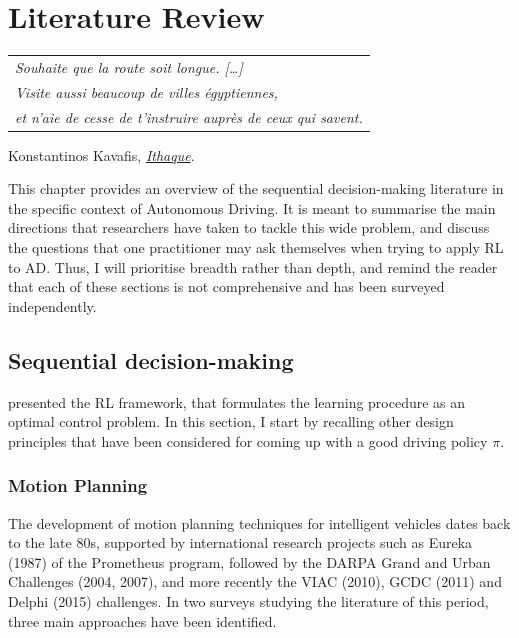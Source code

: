 
\graphicspath{{2-Chapters/2-Chapter/}}

\chapter{Literature Review}
\label{chapter:2}

\begin{flushright}
	\begin{tabular}{@{}l@{}}
		\emph{Souhaite que la route soit longue. [\dots]}\\
		\emph{Visite aussi beaucoup de villes égyptiennes,}\\
		\emph{et n’aie de cesse de t’instruire auprès de ceux qui savent.}\\
	\end{tabular}
	
	Konstantinos Kavafis, \href{https://eleurent.github.io/sisyphe/texts/ithaki.html}{\emph{Ithaque}}.
\end{flushright}

\abstractStartChapter{}%
This chapter provides an overview of the sequential decision-making literature in the specific context of Autonomous Driving. It is meant to summarise the main directions that researchers have taken to tackle this wide problem, and discuss the questions that one practitioner may ask themselves when trying to apply \acl*{RL} to \acl*{AD}. Thus, I will prioritise breadth rather than depth, and remind the reader that each of these sections is not comprehensive and has been surveyed independently.
\minitocStartChapter{}

\section{Sequential decision-making}
\label{sec:sequential-decision-making}

 presented the \acl*{RL} framework, that formulates the learning procedure as an optimal control problem. In this section, I start by recalling other design principles that have been considered for coming up with a good driving policy $\pi$.

\subsection{Motion Planning}

The development of motion planning techniques for intelligent vehicles dates back to the late 80s, supported by international research projects such as Eureka (1987) of the Prometheus program, followed by the DARPA Grand and Urban Challenges (2004, 2007), and more recently the VIAC (2010), GCDC (2011) and Delphi (2015) challenges. In two surveys \citep{Gonzalez2016,Paden2016} studying the literature of this period, three main approaches have been identified.


